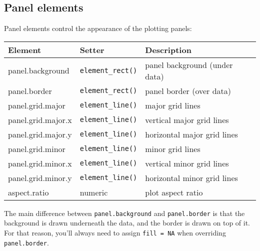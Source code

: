 \subsection{Panel elements}

 

Panel elements control the appearance of the plotting panels:

\begin{longtable}[c]{@{}lll@{}}
\toprule
Element & Setter & Description\tabularnewline
\midrule
\endhead
panel.background & \texttt{element\_rect()} & panel background (under
data)\tabularnewline
panel.border & \texttt{element\_rect()} & panel border (over
data)\tabularnewline
panel.grid.major & \texttt{element\_line()} & major grid
lines\tabularnewline
panel.grid.major.x & \texttt{element\_line()} & vertical major grid
lines\tabularnewline
panel.grid.major.y & \texttt{element\_line()} & horizontal major grid
lines\tabularnewline
panel.grid.minor & \texttt{element\_line()} & minor grid
lines\tabularnewline
panel.grid.minor.x & \texttt{element\_line()} & vertical minor grid
lines\tabularnewline
panel.grid.minor.y & \texttt{element\_line()} & horizontal minor grid
lines\tabularnewline
aspect.ratio & numeric & plot aspect ratio\tabularnewline
\bottomrule
\end{longtable}

The main difference between \texttt{panel.background} and
\texttt{panel.border} is that the background is drawn underneath the
data, and the border is drawn on top of it. For that reason, you'll
always need to assign \texttt{fill\ =\ NA} when overriding
\texttt{panel.border}.

\begin{Shaded}
\begin{Highlighting}[]
\StringTok{ }\StringTok{ }\NormalTok{()}
\StringTok{ }\NormalTok{(} \NormalTok{(} \NormalTok{))}

\StringTok{ }\NormalTok{(}
   \NormalTok{(} \NormalTok{, } \NormalTok{)}
\NormalTok{)}
\StringTok{ }\NormalTok{(}
   \NormalTok{(} \NormalTok{, } \NormalTok{)}
\NormalTok{)}
\end{Highlighting}
\end{Shaded}

